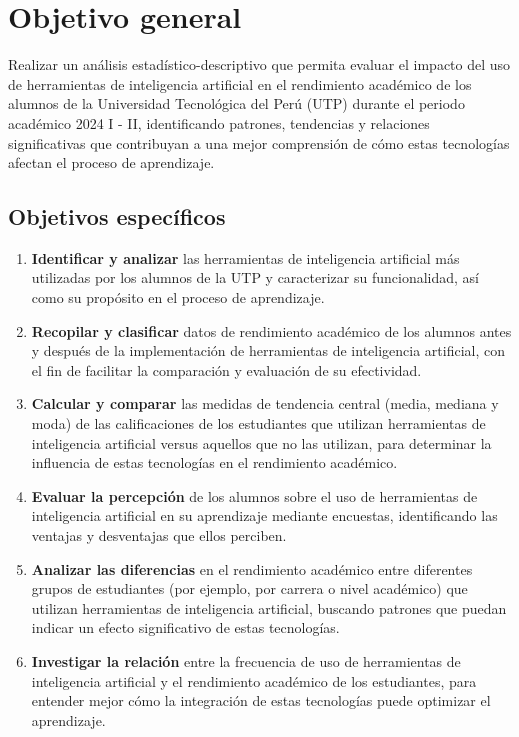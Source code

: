 \documentclass{article}
\begin{document}
\newpage

\section{Objetivo general}

Realizar un análisis estadístico-descriptivo que permita evaluar el impacto del uso de herramientas de inteligencia artificial en el rendimiento académico de los alumnos de la Universidad Tecnológica del Perú (UTP) durante el periodo académico 2024 I - II, identificando patrones, tendencias y relaciones significativas que contribuyan a una mejor comprensión de cómo estas tecnologías afectan el proceso de aprendizaje.


\subsection{Objetivos específicos}

\begin{enumerate}
  \item \textbf{Identificar y analizar} las herramientas de inteligencia artificial más utilizadas por los alumnos de la UTP y caracterizar su funcionalidad, así como su propósito en el proceso de aprendizaje.

  \item \textbf{Recopilar y clasificar} datos de rendimiento académico de los alumnos antes y después de la implementación de herramientas de inteligencia artificial, con el fin de facilitar la comparación y evaluación de su efectividad.

  \item \textbf{Calcular y comparar} las medidas de tendencia central (media, mediana y moda) de las calificaciones de los estudiantes que utilizan herramientas de inteligencia artificial versus aquellos que no las utilizan, para determinar la influencia de estas tecnologías en el rendimiento académico.

  \item \textbf{Evaluar la percepción} de los alumnos sobre el uso de herramientas de inteligencia artificial en su aprendizaje mediante encuestas, identificando las ventajas y desventajas que ellos perciben.

  \item \textbf{Analizar las diferencias} en el rendimiento académico entre diferentes grupos de estudiantes (por ejemplo, por carrera o nivel académico) que utilizan herramientas de inteligencia artificial, buscando patrones que puedan indicar un efecto significativo de estas tecnologías.

  \item \textbf{Investigar la relación} entre la frecuencia de uso de herramientas de inteligencia artificial y el rendimiento académico de los estudiantes, para entender mejor cómo la integración de estas tecnologías puede optimizar el aprendizaje.
\end{enumerate}
\end{document}
